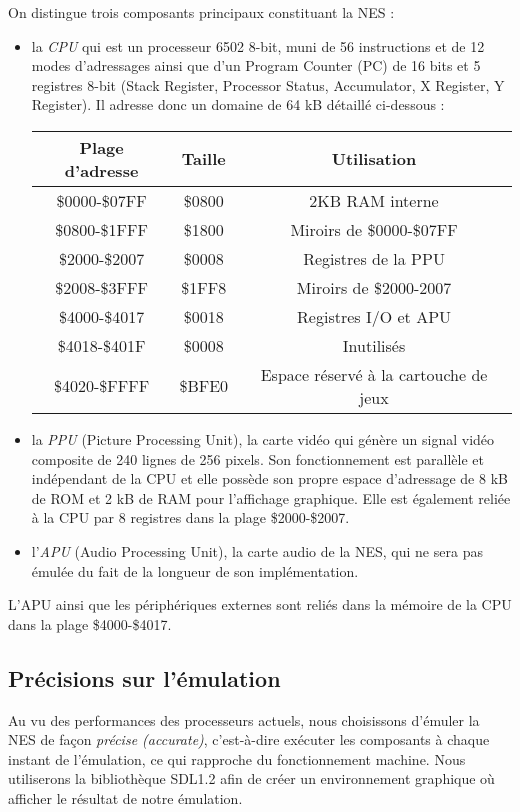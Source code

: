 On distingue trois composants principaux constituant la NES :
\begin{itemize}
\item la \emph{CPU} qui est un processeur 6502 8-bit, muni de 56 instructions et de 12 modes d'adressages ainsi que d'un Program Counter (PC) de 16 bits et 5 registres 8-bit (Stack Register, Processor Status, Accumulator, X Register, Y Register). Il adresse donc un domaine de 64 kB détaillé ci-dessous :

\begin{center}
\begin{tabular}{|c|c|c|}
  \hline
  Plage d'adresse & Taille & Utilisation \\
  \hline
  \$0000-\$07FF & \$0800 & 2KB RAM interne\\
  \hline
  \$0800-\$1FFF & \$1800 & Miroirs de \$0000-\$07FF \\
  \hline
  \$2000-\$2007 & \$0008 & Registres de la PPU \\
  \hline
  \$2008-\$3FFF & \$1FF8 & Miroirs de \$2000-2007 \\
  \hline
  \$4000-\$4017 & \$0018 & Registres I/O et APU \\
  \hline
  \$4018-\$401F & \$0008 & Inutilisés \\
  \hline
  \$4020-\$FFFF & \$BFE0 & Espace réservé à la cartouche de jeux \\
  \hline
\end{tabular}
\end{center}
\hspace{1pt}
\item la \emph{PPU} (Picture Processing Unit), la carte vidéo qui génère un signal vidéo composite de 240 lignes de 256 pixels. Son fonctionnement est parallèle et indépendant de la CPU et elle possède son propre espace d'adressage de 8 kB de ROM et 2 kB de RAM pour l'affichage graphique. Elle est également reliée à la CPU par 8 registres dans la plage \$2000-\$2007.
\item l'\emph{APU} (Audio Processing Unit), la carte audio de la NES, qui ne sera pas émulée du fait de la longueur de son implémentation.
\end{itemize}

L'APU ainsi que les périphériques externes sont reliés dans la mémoire de la CPU dans la plage \$4000-\$4017.

\subsection{Précisions sur l'émulation}
\label{subsec:precision_sur_lemulation}
Au vu des performances des processeurs actuels, nous choisissons d'émuler la NES de façon \emph{précise (accurate)}, c'est-à-dire exécuter les composants à chaque instant de l'émulation, ce qui rapproche du fonctionnement machine.
Nous utiliserons la bibliothèque SDL1.2 afin de créer un environnement graphique où afficher le résultat de notre émulation.
